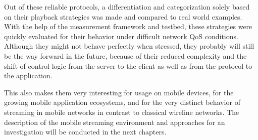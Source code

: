 Out of these reliable protocols, a differentiation and categorization solely based on their playback strategies was made and compared to real world examples. With the help of the measurement framework and testbed, these strategies were quickly evaluated for their behavior under difficult network \gls{QoS} conditions. Although they might not behave perfectly when stressed, they probably will still be the way forward in the future, because of their reduced complexity and the shift of control logic from the server to the client as well as from the protocol to the application.

This also makes them very interesting for usage on mobile devices, for the growing mobile application ecosystems, and for the very distinct behavior of streaming in mobile networks in contrast to classical wireline networks. The description of the mobile streaming environment and approaches for an investigation will be conducted in the next chapters.










%

 
 

